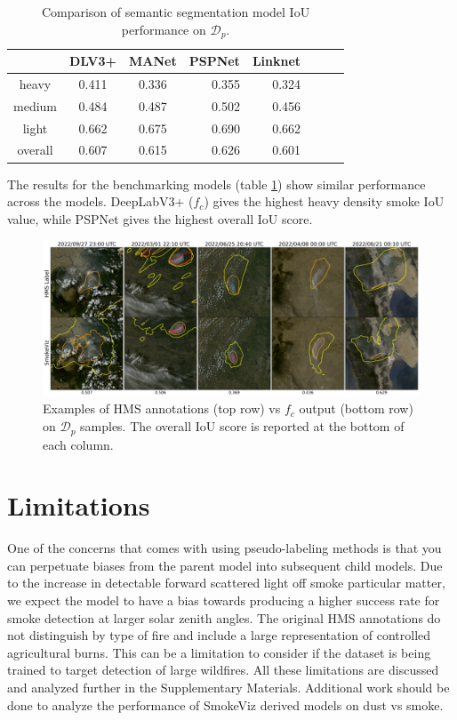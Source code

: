 \documentclass{article}
\begin{document}
\begin{table}[h]
    \caption{Comparison of semantic segmentation model IoU performance on \(\mathcal{D}_{p}\).}\label{bench}
    \centering
    \begin{tabular}{cccrrcrc}
        \toprule
           & DLV3+ & MANet & PSPNet & Linknet \\
        \midrule
        heavy   & 0.411 & 0.336  & 0.355 & 0.324 \\
        medium  & 0.484 & 0.487  & 0.502 & 0.456 \\
        light   & 0.662 & 0.675  & 0.690 & 0.662 \\
        overall & 0.607 & 0.615  & 0.626 & 0.601 \\
        \bottomrule
    \end{tabular}
\end{table}

The results for the benchmarking models (table \ref{bench}) show similar performance across the models. DeepLabV3+ (\(f_c\)) gives the highest heavy density smoke IoU value, while PSPNet gives the highest overall IoU score.

\begin{figure}[!htb]
    \centering
    \includegraphics[width=\linewidth]{figures/examples_small.png}
    \caption{Examples of HMS annotations (top row) vs \(f_{c}\) output (bottom row) on \(\mathcal{D}_{p}\) samples. The overall IoU score is reported at the bottom of each column.}\label{examples}
\end{figure}

\section{Limitations}

One of the concerns that comes with using pseudo-labeling methods is that you can perpetuate biases from the parent model into subsequent child models. Due to the increase in detectable forward scattered light off smoke particular matter, we expect the model to have a bias towards producing a higher success rate for smoke detection at larger solar zenith angles. The original HMS annotations do not distinguish by type of fire and include a large representation of controlled agricultural burns. This can be a limitation to consider if the dataset is being trained to target detection of large wildfires. All these limitations are discussed and analyzed further in the Supplementary Materials. Additional work should be done to analyze the performance of SmokeViz derived models on dust vs smoke.
\end{document}

